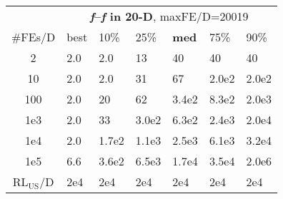 \begin{tabular}{c|llllll}
 & \multicolumn{6}{|c}{\textbf{\textit{f}\raisebox{-0.35ex}{1}--\textit{f}\raisebox{-0.35ex}{24} in 20-D}, maxFE/D=20019}\\
\#FEs/D & best & 10\% & 25\% & \textbf{med} & 75\% & 90\%\\
2 & \hspace*{1ex}2.0 & \hspace*{1ex}2.0 & 13 & 40 & 40 & 40\\
10 & \hspace*{1ex}2.0 & \hspace*{1ex}2.0 & 31 & 67 & 2.0e2 & 2.0e2\\
100 & \hspace*{1ex}2.0 & 20 & 62 & 3.4e2 & 8.3e2 & 2.0e3\\
1e3 & \hspace*{1ex}2.0 & 33 & 3.0e2 & 6.3e2 & 2.4e3 & 2.0e4\\
1e4 & \hspace*{1ex}2.0 & 1.7e2 & 1.1e3 & 2.5e3 & 6.1e3 & 3.2e4\\
1e5 & \hspace*{1ex}6.6 & 3.6e2 & 6.5e3 & 1.7e4 & 3.5e4 & 2.0e6\\
$\text{RL}_{\text{US}}$/D & 2e4 & 2e4 & 2e4 & 2e4 & 2e4 & 2e4
\end{tabular}
